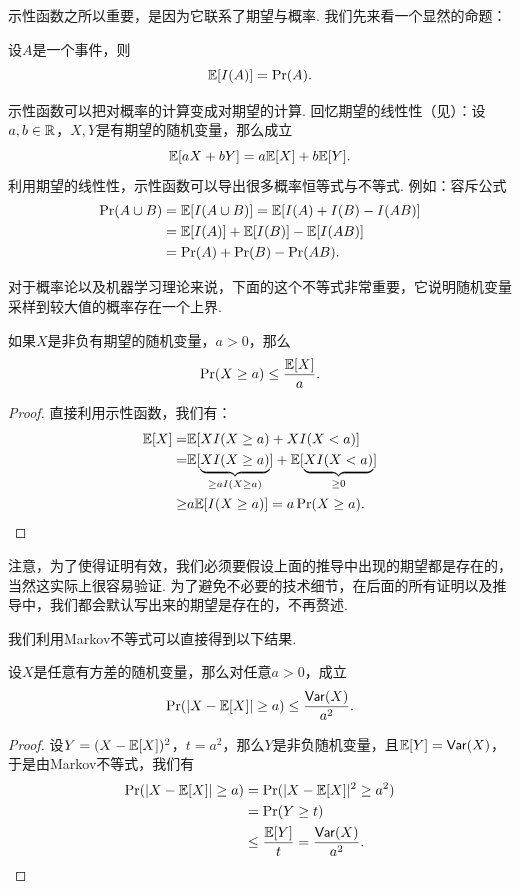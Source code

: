 示性函数之所以重要，是因为它联系了期望与概率. 我们先来看一个显然的命题：
\begin{proposition}\label{proposition:expectation-of-indicator-function}
    设$A$是一个事件，则
    \[
        \mathbb{E}[I(A)] = \Pr(A).
    \]
\end{proposition}

示性函数可以把对概率的计算变成对期望的计算. 回忆期望的线性性（见）：设$a,b\in\mathbb{R}$，$X,Y$是有期望的随机变量，那么成立
\[\mathbb{E}[aX+bY]=a\mathbb{E}[X]+b\mathbb{E}[Y].\]
利用期望的线性性，示性函数可以导出很多概率恒等式与不等式. 例如：容斥公式
\begin{align*}
    \Pr(A\cup B) &= \mathbb{E}[I(A\cup B)] = \mathbb{E}[I(A) + I(B) - I(AB)] \\
    &= \mathbb{E}[I(A)] +  \mathbb{E}[I(B)] -  \mathbb{E}[I(AB)]\\
    &= \Pr(A) + \Pr(B) - \Pr(AB).
\end{align*}

对于概率论以及机器学习理论来说，下面的这个不等式非常重要，它说明随机变量采样到较大值的概率存在一个上界.

\begin{theorem}[Markov不等式]\label{theorem:markov-inequality}
    如果$X$是非负有期望的随机变量，$a>0$，那么
        \[
            \Pr(X\geq a) \leq \frac{\mathbb{E}[X]}{a}.
        \]
\end{theorem}

\begin{proof}
直接利用示性函数，我们有：
    \begin{align*}
        \mathbb{E}[X] = &\mathbb{E}[X I(X\geq a)+X I(X<a)]\\
        =&\mathbb{E}[\underbrace{X I(X\geq a)}_{\geq aI(X\geq a)}]+\mathbb{E}[\underbrace{XI(X<a)}_{\geq 0}]\\
        \geq& a\mathbb{E}[I(X\geq a)]=a\Pr(X\geq a).
    \end{align*}
\end{proof}

注意，为了使得证明有效，我们必须要假设上面的推导中出现的期望都是存在的，当然这实际上很容易验证. 为了避免不必要的技术细节，在后面的所有证明以及推导中，我们都会默认写出来的期望是存在的，不再赘述. 

我们利用Markov不等式可以直接得到以下结果. 
\begin{corollary}[Chebyshev不等式]\label{corollary:chebyshev-inequality}
设$X$是任意有方差的随机变量，那么对任意$a>0$，成立
    \[
        \Pr(|X - \mathbb{E}[X]| \geq a) \leq \frac{\mathsf{Var}(X)}{a^2}.
    \]
\end{corollary}
\begin{proof}
设$Y=(X-\mathbb{E}[X])^2$，$t=a^2$，那么$Y$是非负随机变量，且$\mathbb{E}[Y]=\mathsf{Var}(X)$，于是由Markov不等式，我们有
\begin{align*}
    \Pr(|X - \mathbb{E}[X]| \geq a) &= \Pr(|X - \mathbb{E}[X]|^2 \geq a^2) \\
    &=\Pr(Y \geq t) \\
    &\leq \frac{\mathbb{E}[Y]}{t}=\frac{\mathsf{Var}(X)}{a^2}.
\end{align*}
\end{proof}

